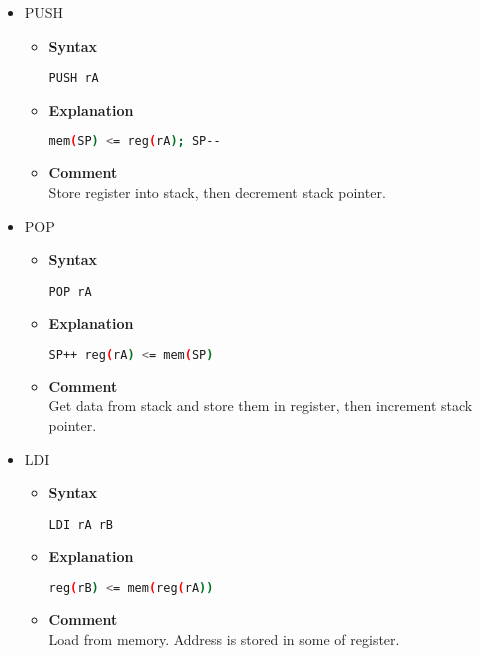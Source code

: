 \begin{itemize}
    \item PUSH
    \begin{itemize}
        \item \textbf{Syntax}
        \begin{lstlisting}[language={[x86masm]Assembler}, frame=single]
    PUSH rA
        \end{lstlisting}
        \item \textbf{Explanation}
        \begin{lstlisting}[language=bash, frame=single]
    mem(SP) <= reg(rA); SP--
        \end{lstlisting}
        \item \textbf{Comment} \\
    Store register into stack, then decrement stack pointer.
    \end{itemize}

    \item POP
    \begin{itemize}
        \item \textbf{Syntax}
        \begin{lstlisting}[language={[x86masm]Assembler}, frame=single]
    POP rA
        \end{lstlisting}
        \item \textbf{Explanation}
        \begin{lstlisting}[language=bash, frame=single]
    SP++ reg(rA) <= mem(SP)
        \end{lstlisting}
        \item \textbf{Comment} \\
    Get data from stack and store them in register, then increment stack pointer.
    \end{itemize}

    \item LDI
    \begin{itemize}
        \item \textbf{Syntax}
        \begin{lstlisting}[language={[x86masm]Assembler}, frame=single]
    LDI rA rB
        \end{lstlisting}
        \item \textbf{Explanation}
        \begin{lstlisting}[language=bash, frame=single]
    reg(rB) <= mem(reg(rA))
        \end{lstlisting}
        \item \textbf{Comment} \\
    Load from memory. Address is stored in some of register.
    \end{itemize}


\end{itemize}
